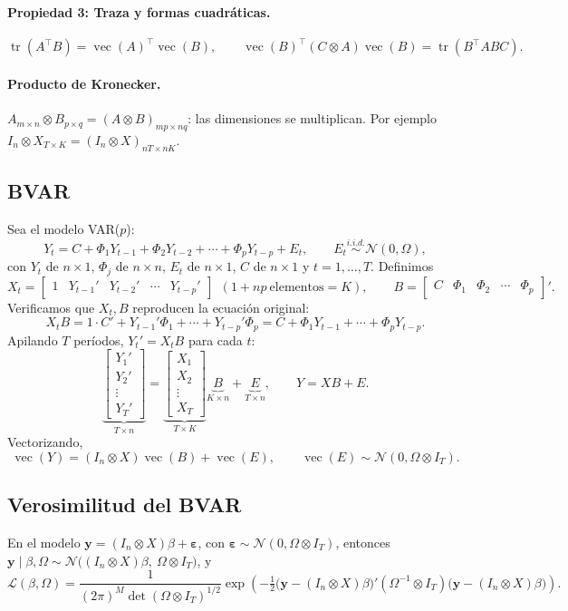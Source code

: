 \documentclass[11pt]{article}
\newcommand{\N}{\mathcal{N}}
\newcommand{\tr}{\operatorname{tr}}
\newcommand{\vecop}{\operatorname{vec}}
\newcommand{\by}{\mathbf{y}}
\newcommand{\beps}{\bm{\varepsilon}}
\newcommand{\kron}{\otimes}
\theoremstyle{definition}
\begin{document}
\paragraph{Propiedad 3: Traza y formas cuadráticas.}
\[
\tr(A^{\top}B)=\vecop(A)^{\top}\vecop(B),\qquad
\vecop(B)^{\top}(C\kron A)\vecop(B)=\tr(B^{\top}ABC).
\]

\paragraph{Producto de Kronecker.}
$A_{m\times n}\kron B_{p\times q}=(A\kron B)_{mp\times nq}$: las dimensiones se multiplican. Por ejemplo $I_n\kron X_{T\times K}=(I_n\kron X)_{nT\times nK}$.

\subsection{BVAR}
Sea el modelo VAR($p$):
\[
Y_t=C+\Phi_1 Y_{t-1}+\Phi_2 Y_{t-2}+\cdots+\Phi_p Y_{t-p}+E_t,\qquad E_t\overset{i.i.d.}{\sim}\N(0,\Omega),
\]
con $Y_t$ de $n\times1$, $\Phi_j$ de $n\times n$, $E_t$ de $n\times1$, $C$ de $n\times1$ y $t=1,\dots,T$. Definimos
\[
X_t=\begin{bmatrix}1 & Y_{t-1}' & Y_{t-2}' & \cdots & Y_{t-p}'\end{bmatrix}\ \ (1+np\ \text{elementos}=K),\qquad
B=\begin{bmatrix}C & \Phi_1 & \Phi_2 & \cdots & \Phi_p\end{bmatrix}'.
\]
Verificamos que $X_t,B$ reproducen la ecuación original:
\[
X_t B=1\cdot C'+Y_{t-1}'\Phi_1+\cdots+Y_{t-p}'\Phi_p=C+\Phi_1 Y_{t-1}+\cdots+\Phi_p Y_{t-p}.
\]
Apilando $T$ períodos, $Y_t'=X_t B$ para cada $t$:
\[
\underbrace{\begin{bmatrix}Y_1'\\ Y_2'\\ \vdots\\ Y_T'\end{bmatrix}}_{T\times n}
=\underbrace{\begin{bmatrix}X_1\\ X_2\\ \vdots\\ X_T\end{bmatrix}}_{T\times K}
\underbrace{B}_{K\times n}+\underbrace{E}_{T\times n},
\qquad Y=XB+E.
\]
Vectorizando,
\[
\vecop(Y)=(I_n\kron X)\vecop(B)+\vecop(E),\qquad \vecop(E)\sim\N(0,\Omega\kron I_T).
\]

\subsection{Verosimilitud del BVAR}
En el modelo $\by=(I_n\kron X)\beta+\beps$, con $\beps\sim\N(0,\Omega\kron I_T)$, entonces $\by\mid\beta,\Omega\sim\N\big((I_n\kron X)\beta,\ \Omega\kron I_T\big)$, y
\[
\mathcal{L}(\beta,\Omega)=\frac{1}{(2\pi)^{M}\det(\Omega\kron I_T)^{1/2}}
\exp\!\left(-\tfrac12\big(\by-(I_n\kron X)\beta\big)'(\Omega^{-1}\kron I_T)\big(\by-(I_n\kron X)\beta\big)\right).
\]
\end{document}
